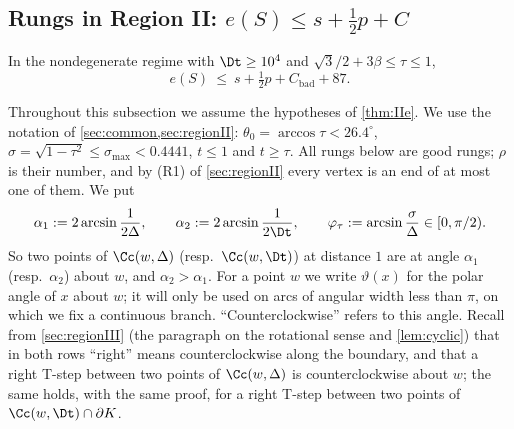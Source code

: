 \subsection{Rungs in Region II: \texorpdfstring{$e(S)\le s+\frac12p+C$}{e(S) <= s + p/2 + C}}\label{sec:IIe}

\begin{theorem}\label{thm:IIe}
In the nondegenerate regime with $\Dt\ge10^4$ and $\sqrt3/2+3\beta\le\tau\le1$,
\[
e(S)\ \le\ s+\tfrac12p+C_{\mathrm{bad}}+87 .
\]
\end{theorem}

Throughout this subsection we assume the hypotheses of \cref{thm:IIe}. We use the notation of \cref{sec:common,sec:regionII}: $\theta_0=\arccos\tau<26.4^\circ$, $\sigma=\sqrt{1-\tau^2}\le\sigma_{\max}<0.4441$, $t\le1$ and $t\ge\tau$. All rungs below are good rungs; $\rho$ is their number, and by (R1) of \cref{sec:regionII} every vertex is an end of at most one of them. We put
\[
\alpha_1:=2\arcsin\frac1{2\Delta},\qquad \alpha_2:=2\arcsin\frac1{2\Dt},\qquad \varphi_\tau:=\arcsin\frac{\sigma}{\Delta}\in[0,\pi/2).
\]
So two points of $\Cc(w,\Delta)$ (resp.\ $\Cc(w,\Dt)$) at distance $1$ are at angle $\alpha_1$ (resp.\ $\alpha_2$) about $w$, and $\alpha_2>\alpha_1$. For a point $w$ we write $\vartheta(x)$ for the polar angle of $x$ about $w$; it will only be used on arcs of angular width less than $\pi$, on which we fix a continuous branch. ``Counterclockwise'' refers to this angle. Recall from \cref{sec:regionIII} (the paragraph on the rotational sense and \cref{lem:cyclic}) that in both rows ``right'' means counterclockwise along the boundary, and that a right T-step between two points of $\Cc(w,\Delta)$ is counterclockwise about $w$; the same holds, with the same proof, for a right T-step between two points of $\Cc(w,\Dt)\cap\partial K$.

